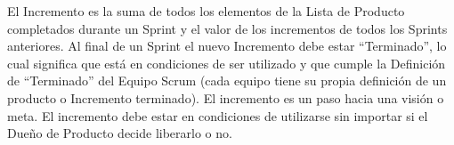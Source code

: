El Incremento es la suma de todos los elementos de la Lista de Producto completados durante un Sprint y el valor de los incrementos de todos los Sprints anteriores. Al final de un Sprint el nuevo Incremento debe estar “Terminado”, lo cual significa que está en condiciones de ser utilizado y que cumple la Definición de “Terminado” del Equipo Scrum (cada equipo tiene su propia definición de un producto o Incremento terminado). El incremento es un paso hacia una visión o meta. El incremento debe estar en condiciones de utilizarse sin importar si el Dueño de Producto decide liberarlo o no. \cite{scrumSchwaber}


